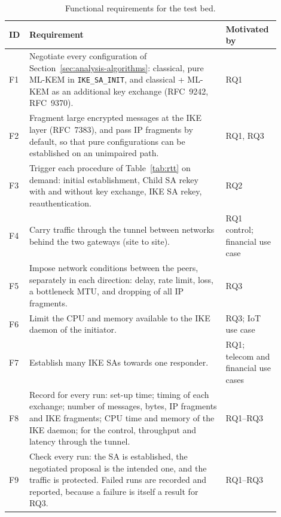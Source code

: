 \begin{table}[!h] \centering
    \footnotesize
    \caption{Functional requirements for the test bed.}
    \label{tab:req-functional}
    \begin{tabular}{| p{0.05\linewidth} | p{0.68\linewidth} | p{0.17\linewidth} |} \hline
        ID & Requirement & Motivated by \\ \hline\hline
        F1 & Negotiate every configuration of
             Section~\ref{sec:analysis-algorithms}: classical, pure ML-KEM in
             \texttt{IKE\_SA\_INIT}, and classical + ML-KEM as an additional
             key exchange (RFC~9242, RFC~9370).
           & RQ1 \\ \hline
        F2 & Fragment large encrypted messages at the IKE layer (RFC~7383),
             and pass IP fragments by default, so that pure configurations can
             be established on an unimpaired path.
           & RQ1, RQ3 \\ \hline
        F3 & Trigger each procedure of Table~\ref{tab:rtt} on demand: initial
             establishment, Child SA rekey with and without key exchange,
             IKE SA rekey, reauthentication.
           & RQ2 \\ \hline
        F4 & Carry traffic through the tunnel between networks behind the two
             gateways (site to site).
           & RQ1 control; financial use case \\ \hline
        F5 & Impose network conditions between the peers, separately in each
             direction: delay, rate limit, loss, a bottleneck MTU, and
             dropping of all IP fragments.
           & RQ3 \\ \hline
        F6 & Limit the CPU and memory available to the IKE daemon of the
             initiator.
           & RQ3; IoT use case \\ \hline
        F7 & Establish many IKE SAs towards one responder.
           & RQ1; telecom and financial use cases \\ \hline
        F8 & Record for every run: set-up time; timing of each exchange;
             number of messages, bytes, IP fragments and IKE fragments; CPU
             time and memory of the IKE daemon; for the control, throughput
             and latency through the tunnel.
           & RQ1--RQ3 \\ \hline
        F9 & Check every run: the SA is established, the negotiated proposal
             is the intended one, and the traffic is protected. Failed runs are
             recorded and reported, because a failure is itself a result for
             RQ3.
           & RQ1--RQ3 \\ \hline
    \end{tabular}
\end{table}

